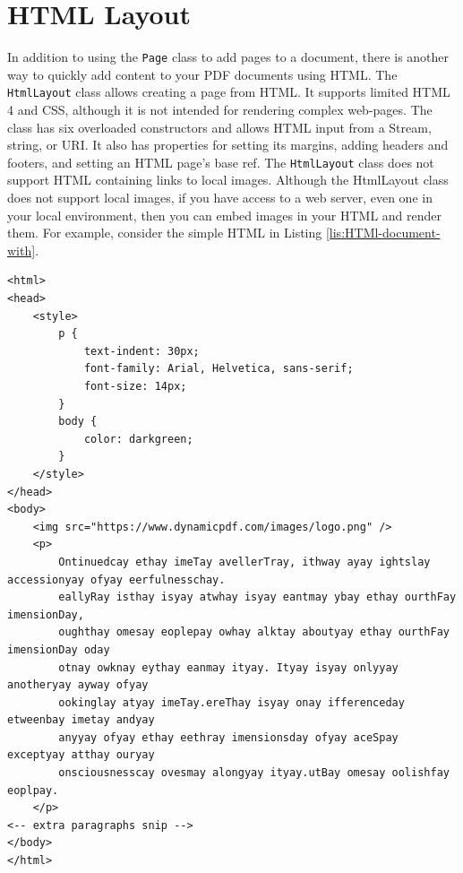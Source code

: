 \documentclass[american,letterpaper]{tufte-book}
\numberwithin{equation}{section}
\numberwithin{figure}{section}
\begin{document}
\section{HTML Layout}

In addition to using the \texttt{Page} class to add pages to a document, there is another way to quickly add content to your PDF documents using
HTML. The \texttt{HtmlLayout} class allows creating a page from HTML.
It supports limited HTML 4 and CSS, although it is not intended for
rendering complex web-pages. The class has six overloaded constructors and allows HTML input from
a Stream, string, or URI. It also has properties for setting its margins,
adding headers and footers, and setting an HTML page's base ref. The
\texttt{HtmlLayout} class does not support HTML containing links to
local images. Although the HtmlLayout class does not support local
images, if you have access to a web server, even one in your local
environment, then you can embed images in your HTML and render them.
For example, consider the simple HTML in Listing \ref{lis:HTMl-document-with}.

\bgroup{}
\begin{lstlisting}[caption={HTMl document with simple CSS and image link.},label={lis:HTMl-document-with},basicstyle={\small\ttfamily},breaklines=true]
<html>
<head>
    <style>
        p {
            text-indent: 30px;
            font-family: Arial, Helvetica, sans-serif;
            font-size: 14px;
        }
        body {
            color: darkgreen;
        }
    </style>
</head>
<body>
    <img src="https://www.dynamicpdf.com/images/logo.png" />
    <p>
        Ontinuedcay ethay imeTay avellerTray, ithway ayay ightslay accessionyay ofyay eerfulnesschay.
        eallyRay isthay isyay atwhay isyay eantmay ybay ethay ourthFay imensionDay,
        oughthay omesay eoplepay owhay alktay aboutyay ethay ourthFay imensionDay oday
        otnay owknay eythay eanmay ityay. Ityay isyay onlyyay anotheryay ayway ofyay
        ookinglay atyay imeTay.ereThay isyay onay ifferenceday etweenbay imetay andyay
        anyyay ofyay ethay eethray imensionsday ofyay aceSpay exceptyay atthay ouryay
        onsciousnesscay ovesmay alongyay ityay.utBay omesay oolishfay eoplpay.
    </p>
<-- extra paragraphs snip -->
</body>
</html>
\end{lstlisting}
\leavevmode\egroup
\end{document}
